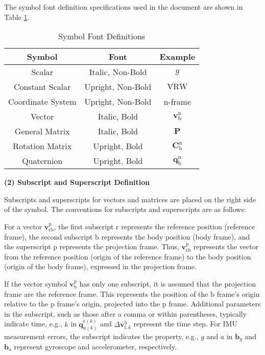 \documentclass{article}
\begin{document}
The symbol font definition specifications used in the document are shown in Table \ref{tab:symbol-font-definition}.
\begin{table}[htbp]
    \centering
    \caption{Symbol Font Definitions}
    \label{tab:symbol-font-definition}
    \begin{tabular}{c c c}
        \toprule
        Symbol & Font & Example\\
        \midrule
        Scalar & Italic, Non-Bold & $g$\\
        Constant Scalar & Upright, Non-Bold & $\text{VRW}$\\
        Coordinate System & Upright, Non-Bold & $\mathrm{n}$-frame \\
        Vector & Italic, Bold & $\boldsymbol{v}_{\mathrm{b}}^{\mathrm{n}}$ \\
        General Matrix & Italic, Bold & $\boldsymbol{P}$ \\
        Rotation Matrix & Upright, Bold & $\mathbf{C}_{\mathrm{b}}^{\mathrm{n}}$ \\
        Quaternion & Upright, Bold & $\mathbf{q}_{\mathrm{b}}^{\mathrm{n}}$ \\
        \bottomrule
    \end{tabular}
\end{table}

\textbf{(2) Subscript and Superscript Definition}

Subscripts and superscripts for vectors and matrices are placed on the right side of the symbol. The conventions for subscripts and superscripts are as follows:

For a vector $\boldsymbol{v}_{\mathrm{r}\mathrm{b}}^{\mathrm{p}}$, the first subscript $\mathrm{r}$ represents the reference position (reference frame), the second subscript $\mathrm{b}$ represents the body position (body frame), and the superscript $\mathrm{p}$ represents the projection frame. Thus, $\boldsymbol{v}_{\mathrm{r}\mathrm{b}}^{\mathrm{p}}$ represents the vector from the reference position (origin of the reference frame) to the body position (origin of the body frame), expressed in the projection frame.

If the vector symbol $\boldsymbol{v}_{\mathrm{b}}^{\mathrm{p}}$ has only one subscript, it is assumed that the projection frame are the reference frame. This represents the position of the $\mathrm{b}$ frame's origin relative to the $\mathrm{p}$ frame's origin, projected into the $\mathrm{p}$ frame. Additional parameters in the subscript, such as those after a comma or within parentheses, typically indicate time, e.g., $k$ in $\mathbf{q}_{\mathrm{n}(k)}^{\mathrm{e}(k)}$ and $\Delta \boldsymbol{v}_{\mathrm{f},k}^{\mathrm{b}}$ represent the time step. For IMU measurement errors, the subscript indicates the property, e.g., $g$ and $a$ in $\boldsymbol{b}_{g}$ and $\boldsymbol{b}_{a}$ represent gyroscope and accelerometer, respectively.
\end{document}
